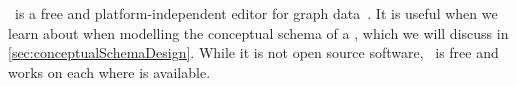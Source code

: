 %
%
\label{sec:installingYed}%
%
\yEd\ is a free and platform-independent editor for graph data~\cite{SG2015MDAWY,Y2011YGEM}.
It is useful when we learn about  when modelling the conceptual schema of a \db, which we will discuss in \cref{sec:conceptualSchemaDesign}.
While it is not open source software, \yEd\ is free and works on each  where  is available.
%
%
%
\endhsection%
%
